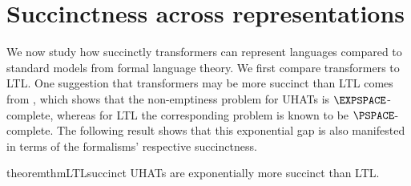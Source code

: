 \documentclass{article} %
\begin{document}
\section{Succinctness across representations}
\label{sec:succinctness}
We now study how succinctly transformers can represent languages compared to standard models from formal language theory.
We first compare transformers to LTL.
One suggestion that transformers may be more succinct than LTL comes from ,
which shows that the non-emptiness problem for UHATs is $\EXPSPACE$-complete,
whereas for LTL the corresponding problem is known to be $\PSPACE$-complete.
The following result shows that this exponential gap is also manifested in terms of the formalisms' respective succinctness.

\begin{restatable}[]{theorem}{thmLTLsuccinct}\label{thm:ltl-succinct}
UHATs are exponentially more succinct than LTL.
\end{restatable}
\end{document}
